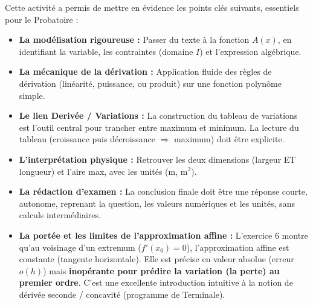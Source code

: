 \documentclass[11pt]{article}
\newcounter{popsec}
\newcounter{popsub}
\newcommand{\courssub}[1]{%
  \stepcounter{popsub}%
  \par\vspace{9pt}\noindent{\popxbold\fontsize{11.5}{13}\selectfont\color{popink}{\color{poporange}\thepopsec.\thepopsub}\hspace{6pt}#1}\par\nopagebreak\vspace{4pt}
}
\begin{document}
\courssub{Bilan de l'activité}
Cette activité a permis de mettre en évidence les points clés suivants, essentiels pour le Probatoire :
\begin{itemize}
    \item \textbf{La modélisation rigoureuse :} Passer du texte à la fonction $A(x)$, en identifiant la variable, les contraintes (domaine $I$) et l'expression algébrique.
    \item \textbf{La mécanique de la dérivation :} Application fluide des règles de dérivation (linéarité, puissance, ou produit) sur une fonction polynôme simple.
    \item \textbf{Le lien Derivée / Variations :} La construction du tableau de variations est l'outil central pour trancher entre maximum et minimum. La lecture du tableau (croissance puis décroissance $\Rightarrow$ maximum) doit être explicite.
    \item \textbf{L'interprétation physique :} Retrouver les deux dimensions (largeur ET longueur) et l'aire max, avec les unités ($\text{m}$, $\text{m}^2$).
    \item \textbf{La rédaction d'examen :} La conclusion finale doit être une réponse courte, autonome, reprenant la question, les valeurs numériques et les unités, sans calculs intermédiaires.
    \item \textbf{La portée et les limites de l'approximation affine :} L'exercice 6 montre qu'au voisinage d'un extremum ($f'(x_0)=0$), l'approximation affine est constante (tangente horizontale). Elle est précise en valeur absolue (erreur $o(h)$) mais \textbf{inopérante pour prédire la variation (la perte) au premier ordre}. C'est une excellente introduction intuitive à la notion de dérivée seconde / concavité (programme de Terminale).
\end{itemize}
\end{document}
